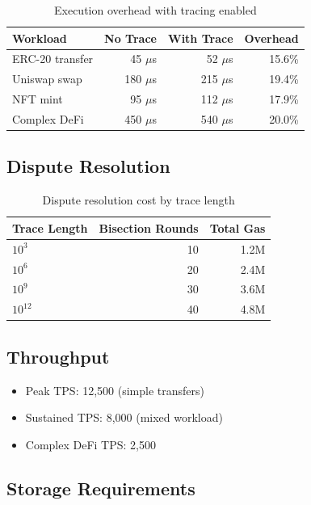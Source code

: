 \documentclass[11pt,a4paper]{article}
\begin{document}
\begin{table}[h]
\centering
\begin{tabular}{lrrr}
\toprule
\textbf{Workload} & \textbf{No Trace} & \textbf{With Trace} & \textbf{Overhead} \\
\midrule
ERC-20 transfer & 45 $\mu$s & 52 $\mu$s & 15.6\% \\
Uniswap swap & 180 $\mu$s & 215 $\mu$s & 19.4\% \\
NFT mint & 95 $\mu$s & 112 $\mu$s & 17.9\% \\
Complex DeFi & 450 $\mu$s & 540 $\mu$s & 20.0\% \\
\bottomrule
\end{tabular}
\caption{Execution overhead with tracing enabled}
\end{table}

\subsection{Dispute Resolution}

\begin{table}[h]
\centering
\begin{tabular}{lrr}
\toprule
\textbf{Trace Length} & \textbf{Bisection Rounds} & \textbf{Total Gas} \\
\midrule
$10^3$ & 10 & 1.2M \\
$10^6$ & 20 & 2.4M \\
$10^9$ & 30 & 3.6M \\
$10^{12}$ & 40 & 4.8M \\
\bottomrule
\end{tabular}
\caption{Dispute resolution cost by trace length}
\end{table}

\subsection{Throughput}

\begin{itemize}
    \item Peak TPS: 12,500 (simple transfers)
    \item Sustained TPS: 8,000 (mixed workload)
    \item Complex DeFi TPS: 2,500
\end{itemize}

\subsection{Storage Requirements}
\end{document}
